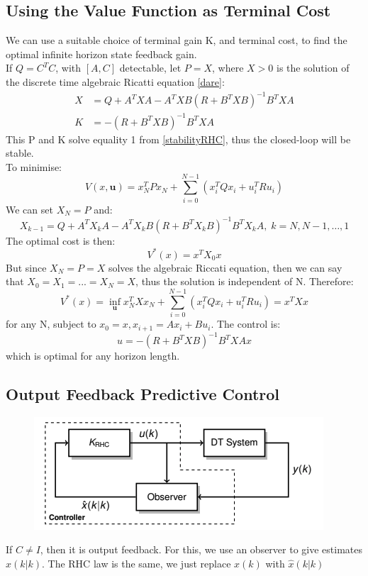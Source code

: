\documentclass{article}
\begin{document}
\subsection{Using the Value Function as Terminal Cost}
We can use a suitable choice of terminal gain K, and terminal cost, to find the optimal infinite horizon state feedback gain. \\
If $Q = C^TC$, with $[A,C]$ detectable, let $P = X$, where $X > 0$ is the solution of the discrete time algebraic Ricatti equation \eqref{dare}:
\[
\begin{aligned}
X &= Q+ A^TXA - A^TXB(R+B^TXB)^{-1}B^TXA \\
K &= -(R+B^TXB)^{-1}B^TXA
\end{aligned}
\]
This P and K solve equality 1 from \eqref{stabilityRHC}, thus the closed-loop will be stable. \\
To minimise:
\[
V(x,\textbf{u}) = x_N^TPx_N + \sum_{i=0}^{N-1}(x_i^TQx_i + u_i^TR u_i)
\]
We can set $X_N = P$ and:
\[
X_{k-1} = Q + A^TX_kA - A^TX_kB(R+B^TX_kB)^{-1}B^TX_kA, \; k=N,N-1,\hdots,1
\]
The optimal cost is then:
\[
V^*(x) = x^TX_0x
\]
But since $X_N=P=X$ solves the algebraic Riccati equation, then we can say that $X_0 = X_1 = ... = X_N = X$, thus the solution is independent of N. Therefore:
\[
V^*(x) = \inf_\textbf{u} x_N^TXx_N + \sum_{i=0}^{N-1} (x_i^TQx_i + u_i^TR u_i) = x^TXx
\]
for any N, subject to $x_0 = x, x_{i+1} = Ax_i + Bu_i$. The control is:
\[
u =  -(R + B^TXB)^{-1}B^TXAx
\]
which is optimal for any horizon length.
\subsection{Output Feedback Predictive Control}
\begin{figure}[H]
    \centering
    \includegraphics[width=0.5\linewidth]{Screenshot 2023-02-23 at 14.15.06.png}
\end{figure}
If $C \neq I$, then it is output feedback. For this, we use an observer to give estimates $\hat x (k|k)$. The RHC law is the same, we just replace $x(k)$ with $\hat x(k|k)$
\end{document}
